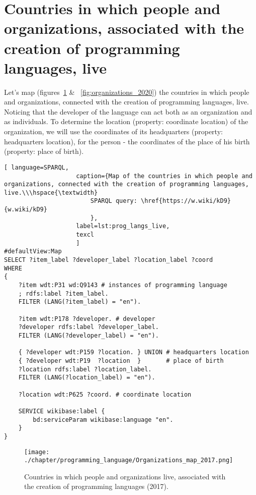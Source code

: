 \section{Countries in which people and organizations, associated with the creation of programming languages, live}

Let's map (figures~\ref{fig:organizations_2017} \& ~\ref{fig:organizations_2020}) the countries in which people and organizations, connected with the creation of programming languages, live. Noticing that the developer of the language can act both as an organization and as individuals. To determine the location (property: coordinate location) of the organization, we will use the coordinates of its headquarters (property: headquarters location), for the person - the coordinates of the place of his birth (property: place of birth).

\begin{lstlisting}[ language=SPARQL, 
                    caption={Map of the countries in which people and organizations, connected with the creation of programming languages, live.\\\hspace{\textwidth}
                        SPARQL query: \href{https://w.wiki/kD9}{w.wiki/kD9}
                        },
                    label=lst:prog_langs_live,
                    texcl 
                    ]
#defaultView:Map
SELECT ?item_label ?developer_label ?location_label ?coord
WHERE
{
    ?item wdt:P31 wd:Q9143 # instances of programming language
    ; rdfs:label ?item_label.     
    FILTER (LANG(?item_label) = "en"). 
  
    ?item wdt:P178 ?developer. # developer
    ?developer rdfs:label ?developer_label. 
    FILTER (LANG(?developer_label) = "en"). 
      		
    { ?developer wdt:P159 ?location. } UNION # headquarters location
    { ?developer wdt:P19  ?location  }       # place of birth
    ?location rdfs:label ?location_label. 
    FILTER (LANG(?location_label) = "en").
    
    ?location wdt:P625 ?coord. # coordinate location

    SERVICE wikibase:label {
        bd:serviceParam wikibase:language "en".
    }   	
}
\end{lstlisting}%

\begin{figure}[h]
\centering
	\texttt{[image: ./chapter/programming\_language/Organizations\_map\_2017.png]}
	\caption{Countries in which people and organizations live, associated with the creation of programming languages (2017).}
	\label{fig:organizations_2017}
\end{figure}

